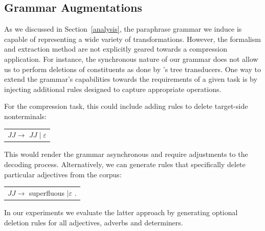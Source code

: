 \documentclass[11pt]{article}
\begin{document}
\vspace{-.2cm}
\subsection{Grammar Augmentations} \label{injection}

As we discussed in Section~\ref{analysis}, the paraphrase grammar we
induce is capable of representing a wide variety of
transformations. However, the formalism and extraction method are not
explicitly geared towards a compression application. For instance,
the synchronous nature of our grammar does not allow us to perform
deletions of constituents as done by 's tree
transducers.  One way to extend the grammar's capabilities
towards the requirements of a given task is by injecting additional
rules designed to capture appropriate operations.

For the compression task, this could include adding rules to delete target-side nonterminals:
\begin{center}
\begin{tabular}{c}
 $\mathit{JJ} \rightarrow$ $\mathit{JJ} \mid \varepsilon$ \\
\end{tabular}
\end{center}
This would render the grammar asynchronous and require
adjustments to the decoding process. Alternatively, we can
generate rules that specifically delete particular adjectives from the
corpus:
\begin{center}
\begin{tabular}{c}
 $\mathit{JJ} \rightarrow$ superfluous $\mid \varepsilon$ .\\
\end{tabular}
\end{center}
In our experiments we evaluate the latter approach by generating optional deletion rules for all adjectives,
adverbs and determiners.

\vspace{-.2cm}
\end{document}
